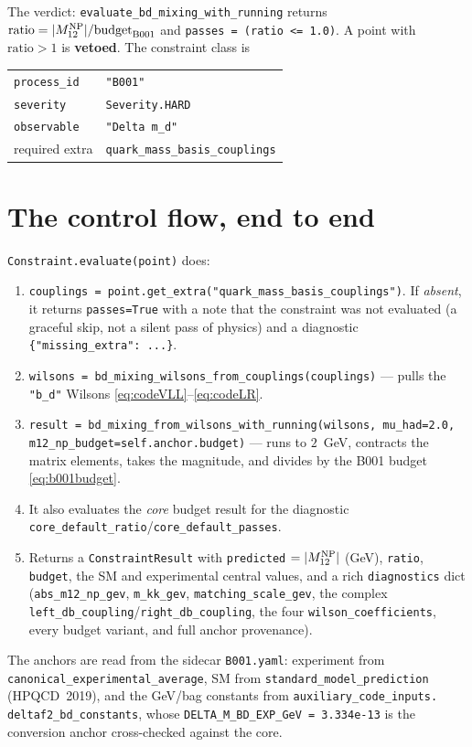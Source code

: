\documentclass[11pt]{article}
\newcommand{\Mtwelve}{M_{12}}
\newcommand{\code}[1]{\texttt{#1}}
\theoremstyle{definition}
\begin{document}
The verdict: \code{evaluate\_bd\_mixing\_with\_running} returns
$\text{ratio} = |\Mtwelve^{\rm NP}|/\text{budget}_{\rm B001}$ and
\code{passes = (ratio <= 1.0)}. A point with $\text{ratio} > 1$ is
\textbf{vetoed}. The constraint class is
\begin{center}
\begin{tabular}{ll}
\toprule
\code{process\_id} & \code{"B001"} \\
\code{severity} & \code{Severity.HARD} \\
\code{observable} & \code{"Delta m\_d"} \\
required extra & \code{quark\_mass\_basis\_couplings} \\
\bottomrule
\end{tabular}
\end{center}

\section{The control flow, end to end}
\label{sec:codeflow}

\code{Constraint.evaluate(point)} does:
\begin{enumerate}[leftmargin=1.6em]
\item \code{couplings = point.get\_extra("quark\_mass\_basis\_couplings")}. If
\emph{absent}, it returns \code{passes=True} with a note that the constraint was
not evaluated (a graceful skip, not a silent pass of physics) and a diagnostic
\code{\{"missing\_extra": ...\}}.
\item \code{wilsons = bd\_mixing\_wilsons\_from\_couplings(couplings)} --- pulls
the \code{"b\_d"} Wilsons \eqref{eq:codeVLL}--\eqref{eq:codeLR}.
\item \code{result = bd\_mixing\_from\_wilsons\_with\_running(wilsons,
mu\_had=2.0, m12\_np\_budget=self.anchor.budget)} --- runs to $2$~GeV, contracts
the matrix elements, takes the magnitude, and divides by the B001 budget
\eqref{eq:b001budget}.
\item It also evaluates the \emph{core} budget result for the diagnostic
\code{core\_default\_ratio}/\code{core\_default\_passes}.
\item Returns a \code{ConstraintResult} with \code{predicted}
$=|\Mtwelve^{\rm NP}|$ (GeV), \code{ratio}, \code{budget}, the SM and experimental
central values, and a rich \code{diagnostics} dict
(\code{abs\_m12\_np\_gev}, \code{m\_kk\_gev}, \code{matching\_scale\_gev},
the complex \code{left\_db\_coupling}/\code{right\_db\_coupling}, the four
\code{wilson\_coefficients}, every budget variant, and full anchor provenance).
\end{enumerate}
The anchors are read from the sidecar \code{B001.yaml}: experiment from
\code{canonical\_experimental\_average}, SM from \code{standard\_model\_prediction}
(HPQCD~2019), and the GeV/bag constants from \code{auxiliary\_code\_inputs.\\deltaf2\_bd\_constants}, whose
\code{DELTA\_M\_BD\_EXP\_GeV = 3.334e-13} is the conversion anchor cross-checked
against the core.
\end{document}
